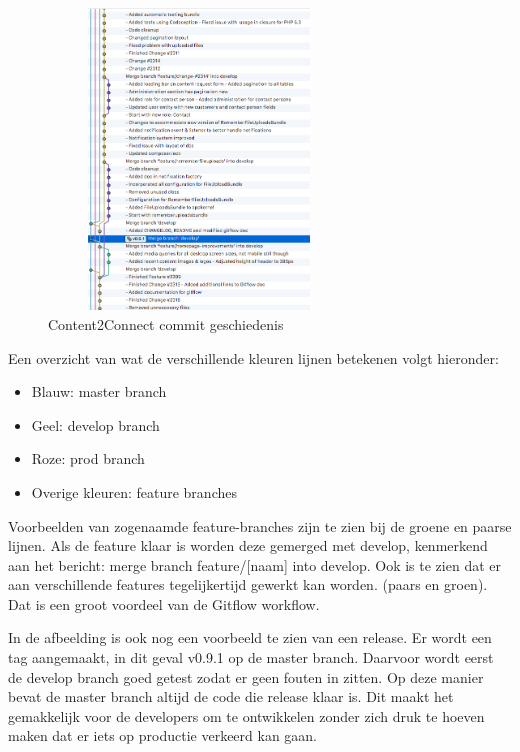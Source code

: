 \vspace{3mm}

\begin{minipage}{0.5\textwidth}
\begin{figure}[H]
\begin{adjustwidth}{-0.6cm}{}
\includegraphics[width=8cm,height=8cm,keepaspectratio]{attachments/Content2Connect-history}
\caption{\label{fig:commit-history} Content2Connect commit geschiedenis}
\end{adjustwidth}
\end{figure}
\end{minipage} \hfill
\begin{minipage}{0.45\textwidth}
\begin{footnotesize}
Een overzicht van wat de verschillende kleuren lijnen betekenen volgt hieronder:
\begin{itemize}
\item Blauw: master branch
\item Geel: develop branch
\item Roze: prod branch
\item Overige kleuren: feature branches
\end{itemize}
Voorbeelden van zogenaamde feature-branches zijn te zien bij de groene en paarse lijnen. Als de feature klaar is worden deze gemerged met develop, kenmerkend aan het bericht: merge branch feature/[naam] into develop. Ook is te zien dat er aan verschillende features tegelijkertijd gewerkt kan worden. (paars en groen). Dat is een groot voordeel van de Gitflow workflow.

In de afbeelding is ook nog een voorbeeld te zien van een release. Er wordt een tag aangemaakt, in dit geval v0.9.1 op de master branch. Daarvoor wordt eerst de develop branch goed getest zodat er geen fouten in zitten. Op deze manier bevat de master branch altijd de code die release klaar is. Dit maakt het gemakkelijk voor de developers om te ontwikkelen zonder zich druk te hoeven maken dat er iets op productie verkeerd kan gaan.
\end{footnotesize}
\end{minipage}

